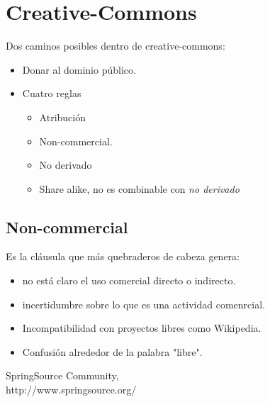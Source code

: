 \documentclass{scrartcl}
\begin{document}
\section{Creative-Commons}

Dos caminos posibles dentro de creative-commons:
\begin{itemize}
    \item Donar al dominio p\'ublico.

    \item Cuatro reglas
    \begin{itemize}
        \item Atribuci\'on
        \item Non-commercial.
        \item No derivado
        \item Share alike, no es combinable con \emph{no derivado}
    \end{itemize}
\end{itemize}

\subsection{Non-commercial}

Es la cl\'ausula que m\'as quebraderos de cabeza genera:
\begin{itemize}
    \item no est\'a claro el uso comercial directo o indirecto.
    \item incertidumbre sobre lo que es una actividad comenrcial.
    \item Incompatibilidad con proyectos libres como Wikipedia.
    \item Confusi\'on alrededor de la palabra "libre".
\end{itemize}

\begin{thebibliography}{9}

  SpringSource Community,\\
  http://www.springsource.org/

\end{thebibliography}
\end{document}
